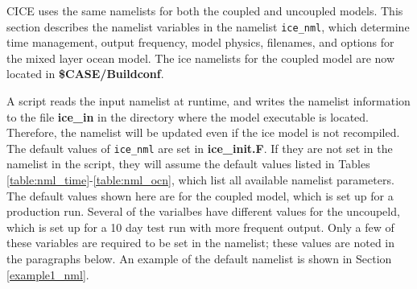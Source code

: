 
CICE uses the same namelists for both the coupled and uncoupled models.
This section describes the namelist variables in the namelist {\tt ice\_nml},
which determine time management, output frequency, model physics, filenames,
and options for the mixed layer ocean model. 
The ice namelists for the coupled model are now located in
{\bf \$CASE/Buildconf}.  

A script reads the input namelist at runtime, and writes the namelist
information to the file {\bf ice\_in} in the directory where the model 
executable is located.  Therefore, the namelist will be updated even if the 
ice model is not recompiled.  The default values of {\tt ice\_nml} are set in 
{\bf ice\_init.F}.  If they are not set in the namelist in the script, they will
assume the default values listed in Tables \ref{table:nml_time}-\ref{table:nml_ocn},
which list all available namelist parameters.  The default values shown here are
for the coupled model, which is set up for a production run.  Several of the
varialbes have different values for the uncoupeld, which is set up for a 10
day test run with more frequent output.  Only a few of these variables are
required to be set in the namelist; these values are noted in the paragraphs
below.  An example of the default namelist is shown in Section \ref{example1_nml}.

